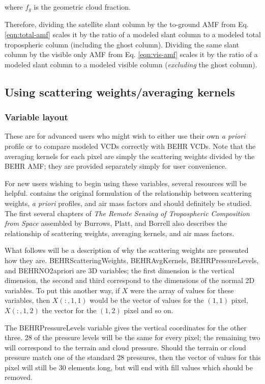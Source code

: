 \documentclass[12pt]{article}
\begin{document}
	where $f_g$ is the geometric cloud fraction. 
	
	Therefore, dividing the satellite slant column by the to-ground AMF from Eq. \eqref{eqn:total-amf} scales it by the ratio of a modeled slant column to a modeled total tropospheric column (including the ghost column). Dividing the same slant column by the visible only AMF from Eq. \eqref{eqn:vis-amf} scales it by the ratio of a modeled slant column to a modeled visible column (\emph{excluding} the ghost column).

	
	\subsection{Using scattering weights/averaging kernels} \label{sec:scweights}
	\subsubsection{Variable layout}
	These are for advanced users who might wish to either use their own \emph{a priori}  profile or to compare modeled  VCDs correctly with BEHR VCDs.  Note that the averaging kernels for each pixel are simply the scattering weights divided by the BEHR AMF; they are provided separately simply for user convenience.
	
	For new users wishing to begin using these variables, several resources will be helpful. \citet{palmer2001} contains the original formulation of the relationship between scattering weights, \emph{a priori}  profiles, and air mass factors and should definitely be studied. The first several chapters of \emph{The Remote Sensing of Tropospheric Composition from Space} assembled by Burrows, Platt, and Borrell \citep{burrows-platt} also describes the relationship of scattering weights, averaging kernels, and air mass factors.
	
	What follows will be a description of why the scattering weights are presented how they are.  BEHRScatteringWeights, BEHRAvgKernels, BEHRPressureLevels, and BEHRNO2apriori are 3D variables; the first dimension is the vertical dimension, the second and third correspond to the dimensions of the normal 2D variables. To put this another way, if $X$ were the array of values for these variables, then $X(:,1,1)$ would be the vector of values for the $(1,1)$ pixel, $X(:,1,2)$ the vector for the $(1,2)$ pixel and so on.
	
	The BEHRPressureLevels variable gives the vertical coordinates for the other three.  28 of the pressure levels will be the same for every pixel; the remaining two will correspond to the terrain and cloud pressure. Should the terrain or cloud pressure match one of the standard 28 pressures, then the vector of values for this pixel will still be 30 elements long, but will end with fill values which should be removed.
	
\end{document}
